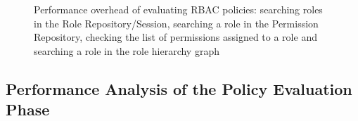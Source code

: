 \documentclass[epsfig,a4paper,11pt,titlepage]{book}
\numberwithin{algorithm}{chapter}
\begin{document}
\begin{figure} [htp]
\centering
{}
\caption[Performance overhead of evaluating RBAC policies]{Performance overhead of evaluating \gls{RBAC} policies:  searching roles in the Role Repository/Session,  searching a role in the Permission Repository,  checking the list of permissions assigned to a role and  searching a role in the role hierarchy graph}
\label{fig:erbac-policy-evaluation-rbac-policy}
\end{figure}


\subsection{Performance Analysis of the Policy Evaluation Phase}
\label{sec:erbac-policy-evaluation}
\end{document}
